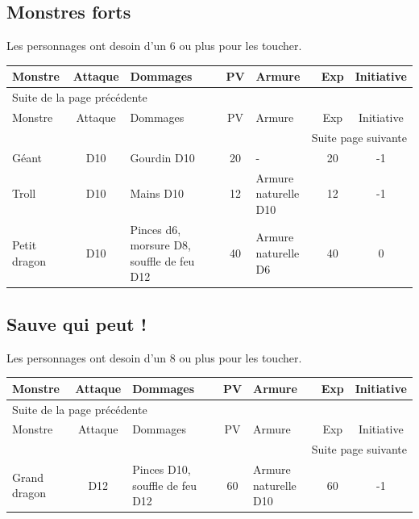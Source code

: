 \documentclass[a4paper, 11pt, twoside]{article}
\begin{document}
\subsection{Monstres forts}
\label{sec:orgb469088}

Les personnages ont desoin d'un 6 ou plus pour les toucher.

\begin{longtable}{p{3cm}|c|p{3.5cm}|c|p{3.8cm}|c|c}
Monstre & Attaque & Dommages & PV & Armure & Exp & Initiative\\
\hline
\endfirsthead
\multicolumn{7}{l}{Suite de la page précédente} \\
\hline

Monstre & Attaque & Dommages & PV & Armure & Exp & Initiative \\

\hline
\endhead
\hline\multicolumn{7}{r}{Suite page suivante} \\
\endfoot
\endlastfoot
\hline
Géant & D10 & Gourdin D10 & 20 & - & 20 & -1\\
\hline
Troll & D10 & Mains D10 & 12 & Armure naturelle D10 & 12 & -1\\
\hline
Petit dragon & D10 & Pinces d6, morsure D8, souffle de feu D12 & 40 & Armure naturelle D6 & 40 & 0\\
\end{longtable}

\subsection{Sauve qui peut !}
\label{sec:orgfc975d0}

Les personnages ont desoin d'un 8 ou plus pour les toucher.

\begin{longtable}{l|c|p{3.5cm}|c|p{3.8cm}|c|c}
Monstre & Attaque & Dommages & PV & Armure & Exp & Initiative\\
\hline
\endfirsthead
\multicolumn{7}{l}{Suite de la page précédente} \\
\hline

Monstre & Attaque & Dommages & PV & Armure & Exp & Initiative \\

\hline
\endhead
\hline\multicolumn{7}{r}{Suite page suivante} \\
\endfoot
\endlastfoot
\hline
Grand dragon & D12 & Pinces D10, souffle de feu D12 & 60 & Armure naturelle D10 & 60 & -1\\
\end{longtable}
\end{document}

